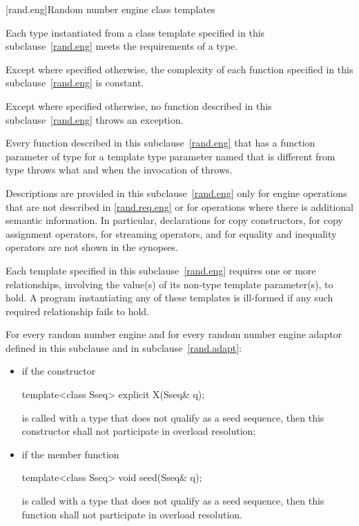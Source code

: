 [rand.eng]{Random number engine class templates}%

\pnum
Each type instantiated
from a class template specified in this subclause~\ref{rand.eng}
meets the requirements
of a  type.

\pnum
Except where specified otherwise,
the complexity of each function
specified in this subclause~\ref{rand.eng}
is constant.

\pnum
Except where specified otherwise,
no function described in this subclause~\ref{rand.eng}
throws an exception.

\pnum
Every function described in this subclause~\ref{rand.eng}
that has a function parameter  of type 
for a template type parameter named 
that is different from type 
throws what and when the invocation of  throws.

\pnum
Descriptions are provided in this subclause~\ref{rand.eng}
only for engine operations
that are not described in \ref{rand.req.eng}
or for operations where there is additional semantic information.
In particular,
declarations for copy constructors,
for copy assignment operators,
for streaming operators,
and for equality and inequality operators
are not shown in the synopses.

\pnum
Each template specified in this subclause~\ref{rand.eng}
requires one or more relationships,
involving the value(s) of its non-type template parameter(s), to hold.
A program instantiating any of these templates
is ill-formed
if any such required relationship fails to hold.

\pnum
For every random number engine and for every random number engine adaptor 
defined in this subclause and in subclause~\ref{rand.adapt}:
\begin{itemize}
\item
if the constructor
\begin{codeblock}
template<class Sseq> explicit X(Sseq& q);
\end{codeblock}
is called with a type  that does not qualify as a seed sequence, then this
constructor shall not participate in overload resolution;

\item
if the member function
\begin{codeblock}
template<class Sseq> void seed(Sseq& q);
\end{codeblock}
is called with a type  that does not qualify as a seed sequence, then this
function shall not participate in overload resolution.
\end{itemize}

